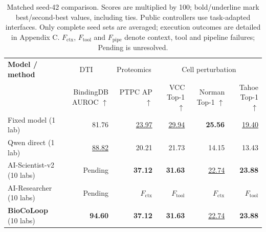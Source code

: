 \begin{table}[t]
\centering\footnotesize
\setlength{\tabcolsep}{3pt}
\renewcommand{\arraystretch}{1.12}
\begin{tabularx}{\linewidth}{@{}Xrrrrr@{}}
\toprule
\textbf{Model / method} & \multicolumn{1}{c}{DTI} & \multicolumn{1}{c}{Proteomics} & \multicolumn{3}{c}{Cell perturbation} \\
\cmidrule(lr){2-2}\cmidrule(lr){3-3}\cmidrule(l){4-6}
 & \shortstack{BindingDB\\AUROC $\uparrow$} & \shortstack{PTPC\\AP $\uparrow$} & \shortstack{VCC\\Top-1 $\uparrow$} & \shortstack{Norman\\Top-1 $\uparrow$} & \shortstack{Tahoe\\Top-1 $\uparrow$} \\
\midrule
Fixed model (1 lab) & 81.76 & \underline{23.97} & \underline{29.94} & \textbf{25.56} & \underline{19.40} \\
Qwen direct (1 lab) & \underline{88.82} & 20.21 & 21.73 & 14.15 & 13.43 \\
AI-Scientist-v2 (10 labs) & Pending & \textbf{37.12} & \textbf{31.63} & \underline{22.74} & \textbf{23.88} \\
AI-Researcher (10 labs) & Pending & $F_{\mathrm{ctx}}$ & $F_{\mathrm{tool}}$ & $F_{\mathrm{ctx}}$ & $F_{\mathrm{tool}}$ \\
\textbf{BioCoLoop} (10 labs) & \textbf{94.60} & \textbf{37.12} & \textbf{31.63} & \underline{22.74} & \textbf{23.88} \\
\bottomrule
\end{tabularx}
\caption{Matched seed-42 comparison. Scores are multiplied by 100; bold/underline mark best/second-best values, including ties. Public controllers use task-adapted interfaces. Only complete seed sets are averaged; execution outcomes are detailed in Appendix C. $F_{\mathrm{ctx}}$, $F_{\mathrm{tool}}$ and $F_{\mathrm{pipe}}$ denote context, tool and pipeline failures; Pending is unresolved.}
\label{tab:public-harness-comparison-seed42}
\end{table}
